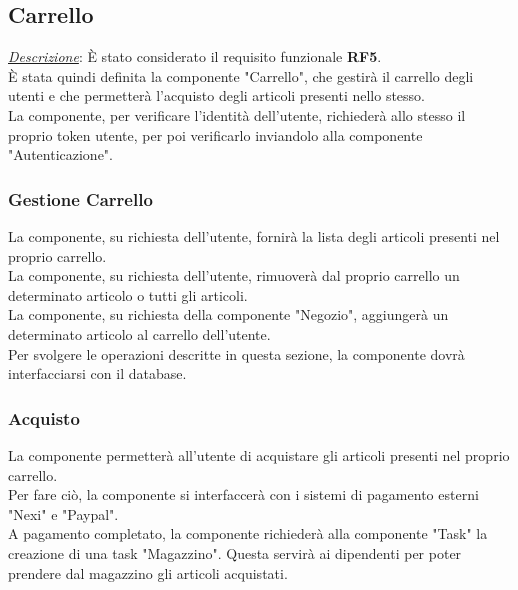 \documentclass{report}
\begin{document}
\subsection*{Carrello}
\uline{\textit{Descrizione}}:
È stato considerato il requisito funzionale \textbf{RF5}.\\
È stata quindi definita la componente "Carrello", che gestirà il carrello degli utenti e che permetterà l'acquisto degli articoli presenti nello stesso.\\
La componente, per verificare l'identità dell'utente, richiederà allo stesso il proprio token utente, per poi verificarlo inviandolo alla componente "Autenticazione".\\
\subsubsection*{Gestione Carrello}
La componente, su richiesta dell'utente, fornirà la lista degli articoli presenti nel proprio carrello.\\
La componente, su richiesta dell'utente, rimuoverà dal proprio carrello un determinato articolo o tutti gli articoli.\\
La componente, su richiesta della componente "Negozio", aggiungerà un determinato articolo al carrello dell'utente.\\
Per svolgere le operazioni descritte in questa sezione, la componente dovrà interfacciarsi con il database.
\subsubsection*{Acquisto}
La componente permetterà all'utente di acquistare gli articoli presenti nel proprio carrello.\\
Per fare ciò, la componente si interfaccerà con i sistemi di pagamento esterni "Nexi" e "Paypal".\\
A pagamento completato, la componente richiederà alla componente "Task" la creazione di una task "Magazzino". 
Questa servirà ai dipendenti per poter prendere dal magazzino gli articoli acquistati. 
\end{document}

